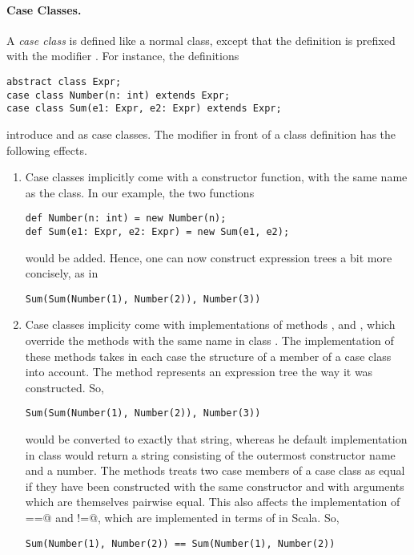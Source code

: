\documentclass[11pt]{book}
\begin{document}
\paragraph{Case Classes.}
A {\em case class} is defined like a normal class, except that the definition
is prefixed with the modifier \verb@case@.  For instance, the definitions
\begin{verbatim}
abstract class Expr;
case class Number(n: int) extends Expr;
case class Sum(e1: Expr, e2: Expr) extends Expr;
\end{verbatim}
introduce \verb@Number@ and \verb@Sum@ as case classes.
The \verb@case@ modifier in front of a class definition has the following effects.
\begin{enumerate}
\item Case classes implicitly come with a constructor function, with the same name as the class. In our example, the two functions
\begin{verbatim}
def Number(n: int) = new Number(n);
def Sum(e1: Expr, e2: Expr) = new Sum(e1, e2);
\end{verbatim}
would be added. Hence, one can now construct expression trees a bit more concisely, as in
\begin{verbatim}
Sum(Sum(Number(1), Number(2)), Number(3))
\end{verbatim} 
\item Case classes implicity come with implementations of methods
\verb@toString@, \verb@equals@ and \verb@hashCode@, which override the
methods with the same name in class \verb@Object@. The implementation
of these methods takes in each case the structure of a member of a
case class into account. The \verb@toString@ method represents an
expression tree the way it was constructed. So,
\begin{verbatim}
Sum(Sum(Number(1), Number(2)), Number(3))
\end{verbatim} 
would be converted to exactly that string, whereas he default
implementation in class \verb@Object@ would return a string consisting
of the outermost constructor name \verb@Sum@ and a number.  The
\verb@equals@ methods treats two case members of a case class as equal
if they have been constructed with the same constructor and with
arguments which are themselves pairwise equal. This also affects the
implementation of \verb@==@ and \verb@!=@, which are implemented in
terms of \verb@equals@ in Scala. So,
\begin{verbatim}
Sum(Number(1), Number(2)) == Sum(Number(1), Number(2))
\end{verbatim}

\end{enumerate}
\end{document}
